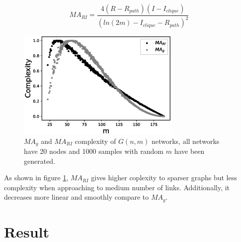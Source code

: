 \documentclass[12pt]{article}
\begin{document}
\begin{equation}
    MA_{RI} = \frac{4(R-R_{path})(I-I_{clique})}{(ln(2m)-I_{clique}-R_{path})^2}
\end{equation}
\begin{figure}[h]
    \centering
    \includegraphics[width=0.7\textwidth]{mariandmag.eps}
    \caption{$MA_g$ and $MA_{RI}$ complexity of $G(n,m)$ networks, all networks have 20 nodes and 1000 samples with random $m$ have been generated.}
    \label{fig:marimagcompare}
\end{figure}
\par
As shown in figure \ref{fig:marimagcompare}, $MA_{RI}$ gives higher coplexity to sparser graphs but less complexity when approaching to medium number of links. Additionally, it decreases more linear and smoothly compare to $MA_g$.

\section{Result}
\end{document}

